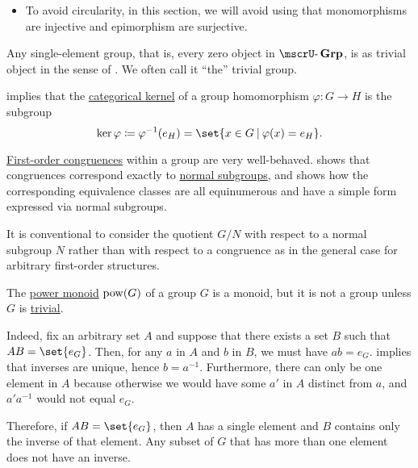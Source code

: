 \begin{definition}
\begin{thmenum}
\begin{itemize}
      \item To avoid circularity, in this section, we will avoid using that monomorphisms are injective and epimorphism are surjective.
    \end{itemize}

     Any single-element group, that is, every zero object in \( \ucat{Grp} \), is as trivial object in the sense of . We often call it \enquote{the} trivial group.

      implies that the \hyperref[def:zero_morphisms/kernel]{categorical kernel} of a group homomorphism \( \varphi: G \to H \) is the subgroup
    \begin{equation*}
      \ker \varphi \coloneqq \varphi^{-1}(e_H) = \set{ x \in G \given \varphi(x) = e_H }.
    \end{equation*}

     \hyperref[def:first_order_congruence]{First-order congruences} within a group are very well-behaved.  shows that congruences correspond exactly to \hyperref[def:normal_subgroup]{normal subgroups}, and  shows how the corresponding equivalence classes are all equinumerous and have a simple form expressed via normal subgroups.

    It is conventional to consider the quotient \( G / N \) with respect to a normal subgroup \( N \) rather than with respect to a congruence as in the general case for arbitrary first-order structures.
  \end{thmenum}
\end{definition}

\begin{example}\label{ex:power_set_is_not_a_group}
  The \hyperref[ex:def:monoid/power]{power monoid} \( \operatorname{pow}(G) \) of a group \( G \) is a monoid, but it is not a group unless \( G \) is \hyperref[def:group/trivial]{trivial}.

  Indeed, fix an arbitrary set \( A \) and suppose that there exists a set \( B \) such that \( AB = \set{ e_G } \). Then, for any \( a \) in \( A \) and \( b \) in \( B \), we must have \( ab = e_G \).  implies that inverses are unique, hence \( b = a^{-1} \). Furthermore, there can only be one element in \( A \) because otherwise we would have some \( a' \) in \( A \) distinct from \( a \), and \( a' a^{-1} \) would not equal \( e_G \).

  Therefore, if \( AB = \set{ e_G } \), then \( A \) has a single element and \( B \) contains only the inverse of that element. Any subset of \( G \) that has more than one element does not have an inverse.
\end{example}

